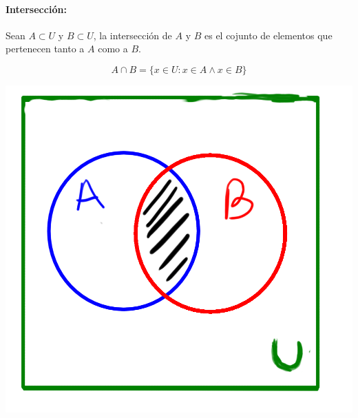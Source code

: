\paragraph{Intersección: }
Sean $A\subset U$ y $B\subset U$, la intersección de $A$ y $B$ es el cojunto de elementos que pertenecen tanto a $A$ como a $B$.
        \begin{center}
    \begin{minipage}{0.4\textwidth}
        \begin{equation*}
            A\cap B = \{x\in U : x\in A \land x\in B\}
        \end{equation*}
    \end{minipage}
    \begin{minipage}{0.4\textwidth}
         \includegraphics[scale=0.3]{imagenes/intersection.png}
    \end{minipage}
    \end{center}
    
